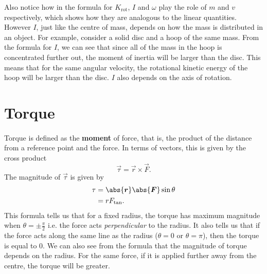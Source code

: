 \documentclass[../classical_mechanics.tex]{subfiles}
\begin{document}
        Also notice how in the formula for $K_\text{rot}$, $I$ and $\omega$ play the role of $m$ and $v$ respectively, which shows how they are analogous to the linear quantities.
        However $I$, just like the centre of mass, depends on how the mass is distributed in an object.
        For example, consider a solid disc and a hoop of the same mass.
        From the formula for $I$, we can see that since all of the mass in the hoop is concentrated further out, the moment of inertia will be larger than the disc.
        This means that for the same angular velocity, the rotational kinetic energy of the hoop will be larger than the disc.
        $I$ also depends on the axis of rotation.

    \section{Torque}
        \paragraph{}
        Torque is defined as the \textbf{moment} of force, that is, the product of the distance from a reference point and the force.
        In terms of vectors, this is given by the cross product
        \begin{equation}
            \vec{\tau}=\vec{r}\times\vec{F}.
        \end{equation}
        The magnitude of $\vec{\tau}$ is given by
        \begin{align}
            \tau&=\abs{\vec{r}}\abs{\vec{F}}\sin\theta\\
            &=rF_\text{tan}.
        \end{align}
        This formula tells us that for a fixed radius, the torque has maximum magnitude when $\theta=\pm\frac{\pi}{2}$ i.e. the force acts \textit{perpendicular} to the radius.
        It also tells us that if the force acts along the same line as the radius ($\theta=0$ or $\theta=\pi$), then the torque is equal to 0.
        We can also see from the formula that the magnitude of torque depends on the radius.
        For the same force, if it is applied further away from the centre, the torque will be greater.
    
\end{document}

